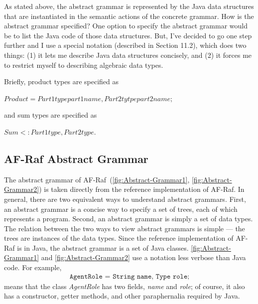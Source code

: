 \documentclass[a4paper,12pt,oneside,fleqn]{book} %
\begin{document}
As stated above, the abstract grammar is represented by the Java data
structures that are instantiated in the semantic actions of the concrete
grammar. How is the abstract grammar specified? One option to specify the
abstract grammar would be to list the Java code of those data structures.
But, I've decided to go one step further and I use a special notation
(described in Section 11.2), which does two things: (1) it lets me describe
Java data structures concisely, and (2) it forces me to restrict myself to
describing algebraic data types.

Briefly, product types are specified as

  $Product = Part1type part1name, Part2tytpe part2name;$

  and sum types are specified as

    $Sum <: Part1type, Part2type.$


\subsection{AF-Raf Abstract Grammar} %
The abstract grammar of AF-Raf~(\autoref{fig:Abstract-Grammar1},
\autoref{fig:Abstract-Grammar2}) is taken
directly from the reference implementation of AF-Raf.  In general, there
are two equivalent ways to understand abstract grammars. First, an abstract
grammar is a concise way to specify a set of trees, each of which
represents a program. Second, an abstract grammar is simply a set of data
types. The relation between the two ways to view abstract grammars is
simple --- the trees are instances of the data types. Since the reference
implementation of AF-Raf is in Java, the abstract grammar is a set of Java
classes. \autoref{fig:Abstract-Grammar1} and \autoref{fig:Abstract-Grammar2} use a notation less verbose than Java code. For example,
\begin{align}
\texttt{AgentRole = String name, Type role;}
\end{align}
means that the class {\it AgentRole\/} has two fields, {\it name\/} and
{\it role}; of course, it also has a constructor, getter methods, and other
paraphernalia required by Java.
\end{document}
